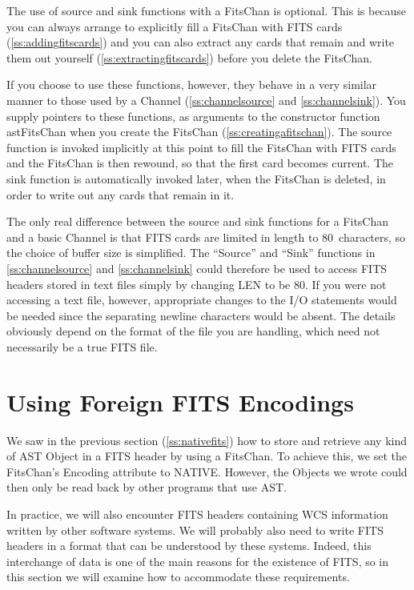 \documentclass[twoside,11pt]{article}
\newcommand{\htmlref}[2]{#1}
\newcommand{\secref}[1]{\S\ref{#1}}
\renewcommand{\secref}[1]{\ref{#1}}
\begin{document}
The use of source and sink functions with a \htmlref{FitsChan}{FitsChan} is optional. This
is because you can always arrange to explicitly fill a FitsChan with
FITS cards (\secref{ss:addingfitscards}) and you can also extract any
cards that remain and write them out yourself
(\secref{ss:extractingfitscards}) before you delete the FitsChan.

If you choose to use these functions, however, they behave in a very
similar manner to those used by a \htmlref{Channel}{Channel} (\secref{ss:channelsource}
and \secref{ss:channelsink}). You supply pointers to these functions,
as arguments to the constructor function \htmlref{astFitsChan}{astFitsChan} when you create
the FitsChan (\secref{ss:creatingafitschan}). The source function is
invoked implicitly at this point to fill the FitsChan with FITS cards
and the FitsChan is then rewound, so that the first card becomes
current. The sink function is automatically invoked later, when the
FitsChan is deleted, in order to write out any cards that remain in
it.

The only real difference between the source and sink functions for a
FitsChan and a basic Channel is that FITS cards are limited in length
to 80~characters, so the choice of buffer size is simplified.  The
``Source'' and ``Sink'' functions in \secref{ss:channelsource} and
\secref{ss:channelsink} could therefore be used to access FITS headers
stored in text files simply by changing LEN to be 80.  If you were not
accessing a text file, however, appropriate changes to the I/O
statements would be needed since the separating newline characters
would be absent. The details obviously depend on the format of the
file you are handling, which need not necessarily be a true FITS file.


\cleardoublepage
%
\section{\label{ss:foreignfits}Using Foreign FITS Encodings}

We saw in the previous section (\secref{ss:nativefits}) how to store
and retrieve any kind of AST \htmlref{Object}{Object} in a FITS header by using a
\htmlref{FitsChan}{FitsChan}. To achieve this, we set the FitsChan's \htmlref{Encoding}{Encoding} attribute to
NATIVE. However, the Objects we wrote could then only be read back by
other programs that use AST.

In practice, we will also encounter FITS headers containing WCS
information written by other software systems.  We will probably also
need to write FITS headers in a format that can be understood by these
systems. Indeed, this interchange of data is one of the main reasons
for the existence of FITS, so in this section we will examine how to
accommodate these requirements.
\end{document}
